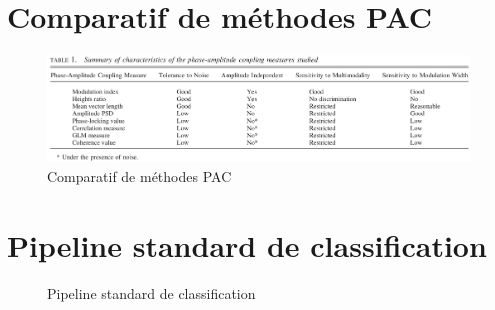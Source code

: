 \section{Comparatif de m\'{e}thodes PAC \citep{tort_measuring_2010}}
\begin{figure}[H]
	\centering
	\includegraphics[scale=0.4,angle=-90]{./figures/PAC_methods_comparison}
	\caption{Comparatif de m\'{e}thodes PAC \citep{tort_measuring_2010}}
	\label{comp_pac}
\end{figure}

\section{Pipeline standard de classification}
\begin{figure}[H]
	\centering
	\caption{Pipeline standard de classification}
	\label{clf_pip}
\end{figure}

